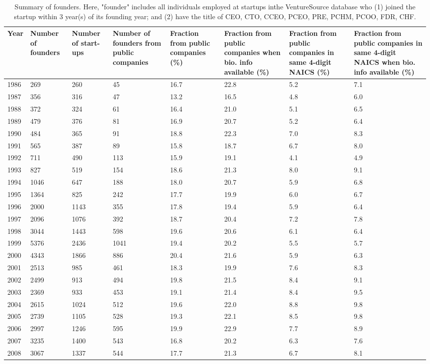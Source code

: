 \begin{table}
\centering
\begingroup\scriptsize
\begin{tabular}{p{1.75cm}p{1.75cm}p{1.75cm}p{1.75cm}p{1.75cm}p{1.75cm}p{1.75cm}p{1.75cm}}
  \toprule
Year & Number of founders & Number of start-ups & Number of founders from public companies & Fraction from public companies (\%) & Fraction from public companies when bio. info available (\%) & Fraction from public companies in same 4-digit NAICS (\%) & Fraction from public companies in same 4-digit NAICS when bio. info available (\%) \\ 
  \midrule
1986 & 269 & 260 & 45 & 16.7 & 22.8 & 5.2 & 7.1 \\ 
  1987 & 356 & 316 & 47 & 13.2 & 16.5 & 4.8 & 6.0 \\ 
  1988 & 372 & 324 & 61 & 16.4 & 21.0 & 5.1 & 6.5 \\ 
  1989 & 479 & 376 & 81 & 16.9 & 20.7 & 5.2 & 6.4 \\ 
  1990 & 484 & 365 & 91 & 18.8 & 22.3 & 7.0 & 8.3 \\ 
  1991 & 565 & 387 & 89 & 15.8 & 18.7 & 6.7 & 8.0 \\ 
  1992 & 711 & 490 & 113 & 15.9 & 19.1 & 4.1 & 4.9 \\ 
  1993 & 827 & 519 & 154 & 18.6 & 21.3 & 8.0 & 9.1 \\ 
  1994 & 1046 & 647 & 188 & 18.0 & 20.7 & 5.9 & 6.8 \\ 
  1995 & 1364 & 825 & 242 & 17.7 & 19.9 & 6.0 & 6.7 \\ 
  1996 & 2000 & 1143 & 355 & 17.8 & 19.4 & 5.9 & 6.4 \\ 
  1997 & 2096 & 1076 & 392 & 18.7 & 20.4 & 7.2 & 7.8 \\ 
  1998 & 3044 & 1443 & 598 & 19.6 & 20.6 & 6.1 & 6.4 \\ 
  1999 & 5376 & 2436 & 1041 & 19.4 & 20.2 & 5.5 & 5.7 \\ 
  2000 & 4343 & 1866 & 886 & 20.4 & 21.6 & 5.9 & 6.3 \\ 
  2001 & 2513 & 985 & 461 & 18.3 & 19.9 & 7.6 & 8.3 \\ 
  2002 & 2499 & 913 & 494 & 19.8 & 21.5 & 8.4 & 9.1 \\ 
  2003 & 2369 & 933 & 453 & 19.1 & 21.4 & 8.4 & 9.5 \\ 
  2004 & 2615 & 1024 & 512 & 19.6 & 22.0 & 8.8 & 9.8 \\ 
  2005 & 2739 & 1105 & 528 & 19.3 & 22.1 & 8.5 & 9.8 \\ 
  2006 & 2997 & 1246 & 595 & 19.9 & 22.9 & 7.7 & 8.9 \\ 
  2007 & 3235 & 1400 & 543 & 16.8 & 20.2 & 6.3 & 7.6 \\ 
  2008 & 3067 & 1337 & 544 & 17.7 & 21.3 & 6.7 & 8.1 \\ 
   \bottomrule
\end{tabular}
\endgroup
\caption{Summary of founders. Here, "founder" includes all individuals employed at startups inthe VentureSource database who (1) joined the startup within 3 year(s) of its founding year; and (2) have the title of CEO, CTO, CCEO, PCEO, PRE, PCHM, PCOO, FDR, CHF.} 
\label{table:GStable_founder2}
\end{table}
